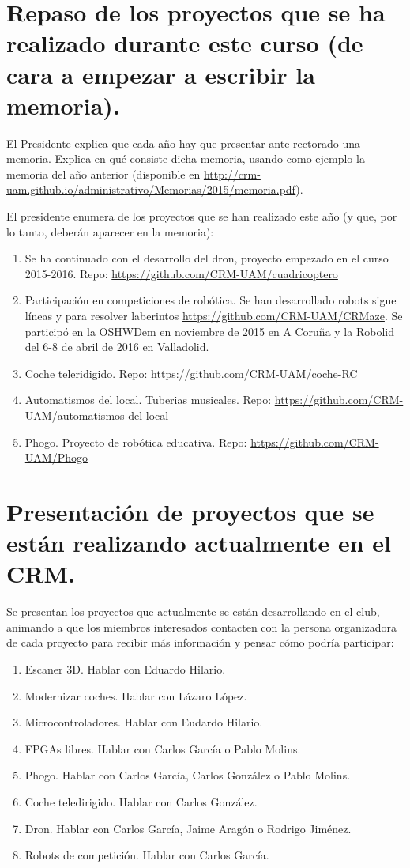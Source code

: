 \documentclass[a4paper]{article}
\begin{document}
\section{Repaso de los proyectos que se ha realizado durante este curso (de cara a empezar a escribir la memoria).}

El Presidente explica que cada año hay que presentar ante rectorado una memoria. Explica en qué consiste dicha memoria, usando como ejemplo la memoria del año anterior (disponible en \url{http://crm-uam.github.io/administrativo/Memorias/2015/memoria.pdf}).

El presidente enumera de los proyectos que se han realizado este año (y que, por lo tanto, deberán aparecer en la memoria):

\begin{enumerate}
\item Se ha continuado con el desarrollo del dron, proyecto empezado en el curso 2015-2016. Repo: \url{https://github.com/CRM-UAM/cuadricoptero}
\item Participación en competiciones de robótica. Se han desarrollado robots sigue líneas y para resolver laberintos \url{https://github.com/CRM-UAM/CRMaze}. Se participó en la OSHWDem en noviembre de 2015 en A Coruña y la Robolid del 6-8 de abril de 2016 en Valladolid.
\item Coche teleridigido. Repo: \url{https://github.com/CRM-UAM/coche-RC}
\item Automatismos del local. Tuberias musicales. Repo: \url{https://github.com/CRM-UAM/automatismos-del-local}
\item Phogo. Proyecto de robótica educativa. Repo: \url{https://github.com/CRM-UAM/Phogo}
\end{enumerate}

\section{Presentación de proyectos que se están realizando actualmente en el CRM.}

Se presentan los proyectos que actualmente se están desarrollando en el club, animando a que los miembros interesados contacten con la persona organizadora de cada proyecto para recibir más información y pensar cómo podría participar:

\begin{enumerate}
\item Escaner 3D. Hablar con Eduardo Hilario.
\item Modernizar coches. Hablar con Lázaro López.
\item Microcontroladores. Hablar con Eudardo Hilario.
\item FPGAs libres. Hablar con Carlos García o Pablo Molins.
\item Phogo. Hablar con Carlos García, Carlos González o Pablo Molins.
\item Coche teledirigido. Hablar con Carlos González.
\item Dron. Hablar con Carlos García, Jaime Aragón o Rodrigo Jiménez.
\item Robots de competición. Hablar con Carlos García.
\end{enumerate}
\end{document}
